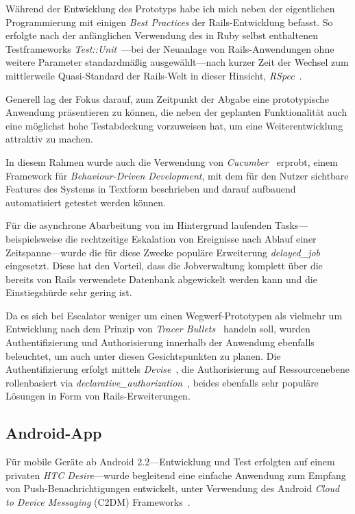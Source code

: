 \documentclass[11pt,utf8,notoc,bibnum,german,final]{zihpub}
\begin{document}
Während der Entwicklung des Prototyps habe ich mich neben der eigentlichen
Programmierung mit einigen \emph{Best Practices} der Rails-Entwicklung befasst.
So erfolgte nach der anfänglichen Verwendung des in Ruby selbst enthaltenen
Testframeworks \emph{Test::Unit}~\cite{testunit}—bei der Neuanlage von
Rails-Anwendungen ohne weitere Parameter standardmäßig ausgewählt—nach kurzer
Zeit der Wechsel zum mittlerweile Quasi-Standard der Rails-Welt in dieser
Hinsicht, \emph{RSpec}~\cite{rspec}.

Generell lag der Fokus darauf, zum Zeitpunkt der Abgabe eine prototypische
Anwendung präsentieren zu können, die neben der geplanten Funktionalität auch
eine möglichst hohe Testabdeckung vorzuweisen hat, um eine Weiterentwicklung
attraktiv zu machen.

In diesem Rahmen wurde auch die Verwendung von \emph{Cucumber}~\cite{cucumber}
erprobt, einem Framework für \emph{Behaviour-Driven Development}, mit dem für
den Nutzer sichtbare Features des Systems in Textform beschrieben und darauf
aufbauend automatisiert getestet werden können.

Für die asynchrone Abarbeitung von im Hintergrund laufenden
Tasks—beispielsweise die rechtzeitige Eskalation von Ereignisse nach Ablauf
einer Zeitspanne—wurde die für diese Zwecke populäre Erweiterung
\emph{delayed\_job}~\cite{delayedjob} eingesetzt. Diese hat den Vorteil, dass
die Jobverwaltung komplett über die bereits von Rails verwendete Datenbank
abgewickelt werden kann und die Einstiegshürde sehr gering ist.

Da es sich bei Escalator weniger um einen Wegwerf-Prototypen als vielmehr um
Entwicklung nach dem Prinzip von \emph{Tracer
Bullets}~\cite[S. 47 ff.]{pragprog-tracerbullets} handeln soll, wurden Authentifizierung
und Authorisierung innerhalb der Anwendung ebenfalls beleuchtet, um auch unter
diesen Gesichtspunkten zu planen.  Die Authentifizierung erfolgt mittels
\emph{Devise}~\cite{devise}, die Authorisierung auf Ressourcenebene
rollenbasiert via
\emph{declarative\_authorization}~\cite{declarative-authorization}, beides
ebenfalls sehr populäre Lösungen in Form von Rails-Erweiterungen.


\subsection{Android-App}

Für mobile Geräte ab Android 2.2—Entwicklung und Test erfolgten auf einem
privaten \emph{HTC Desire}—wurde begleitend eine einfache Anwendung zum Empfang
von Push-Benachrichtigungen entwickelt, unter Verwendung des Android
\emph{Cloud to Device Messaging} (C2DM) Frameworks~\cite{c2dm}.
\end{document}
